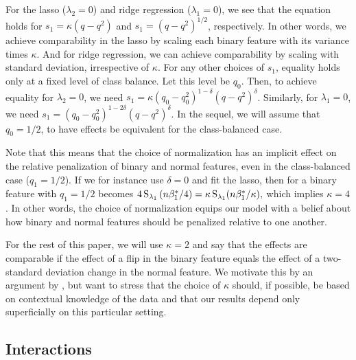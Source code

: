 For the lasso (\(\lambda_2 = 0\)) and ridge regression (\(\lambda_1=0\)), we see that the
equation holds for \(s_1 = \kappa (q - q^2)\) and \(s_1 = (q - q^2)^{1/2}\), respectively.
In other words, we achieve comparability in the lasso by scaling each binary feature with
its variance times \(\kappa\). And for ridge regression, we can achieve comparability by
scaling with standard deviation, irrespective of \(\kappa\). For any other choices of
\(s_1\), equality holds only at a fixed level of class balance. Let this level be \(q_0\).
Then, to achieve equality for \(\lambda_2 = 0\), we need \(s_1 =\kappa (q_0 - q_0^2)^{1 -
  \delta}(q - q^2)^\delta\). Similarly, for \(\lambda_1 = 0\), we need \(s_1 = (q_0 -
q_0^2)^{1 - 2\delta} (q - q^2)^\delta\). In the sequel, we will assume that \(q_0 = 1/2\),
to have effects be equivalent for the class-balanced case.

Note that this means that the choice of normalization has an implicit effect on the
relative penalization of binary and normal features, even in the class-balanced case (\(q_1
= 1/2\)). If we for instance use \(\delta=0\) and fit the lasso, then
 for a binary feature with \(q_1=1/2\) becomes
\(4\operatorname{S}_{\lambda_1}\left(n\beta_1^*/4\right) = \kappa \operatorname{S}_{\lambda_1}(n\beta_1^*/\kappa ),\)
which implies \(\kappa = 4\). In other words, the choice of normalization equips our model
with a belief about how binary and normal features should be penalized relative to one
another.

For the rest of this paper, we will use \(\kappa = 2\) and say that the effects are
comparable if the effect of a flip in the binary feature equals the effect of a
two-standard deviation change in the normal feature. We motivate this by an argument by
\citet{gelman2008}, but want to stress that the choice of \(\kappa\) should, if possible,
be based on contextual knowledge of the data and that our results depend only superficially
on this particular setting.


\subsection{Interactions}\label{sec:interactions}


